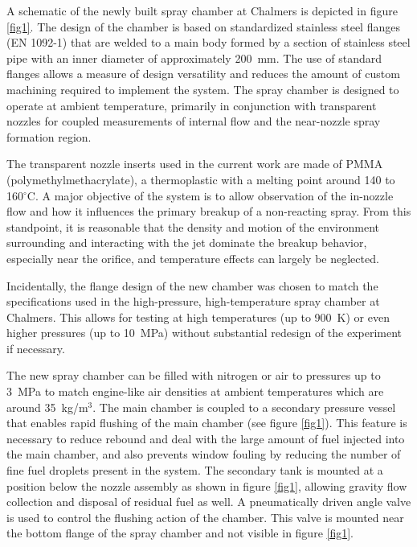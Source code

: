 \documentclass[letterpaper,twocolumn,10pt]{ilass}
\begin{document}
%
A schematic of the newly built spray chamber at Chalmers is depicted in figure \ref{fig1}.
The design of the chamber is based on standardized stainless
steel flanges (EN 1092-1) that are welded to a main body formed by a section of
stainless steel pipe with an inner diameter of approximately 200~mm.
%
The use of standard flanges allows a measure of design versatility and reduces the amount of custom machining required to implement the system.
%
The spray chamber is designed to operate at ambient temperature, primarily in conjunction
with transparent nozzles for coupled measurements of internal flow and the near-nozzle
spray formation region.
%

The transparent nozzle inserts used in the current work are made of PMMA
(polymethylmethacrylate), a thermoplastic with a melting point around
140 to 160$^{\circ}$C.
%
A major objective of the system is to allow observation of the in-nozzle flow and how it
influences the primary breakup of a non-reacting spray. From this standpoint, it is reasonable
that the density and motion of the environment surrounding and interacting with the jet
dominate the breakup behavior, especially near the orifice, and temperature effects can
largely be neglected.
%

Incidentally, the flange design of the new chamber was chosen to match the specifications
used in the high-pressure, high-temperature spray chamber at Chalmers. This allows for
testing at high temperatures (up to 900~K) or even higher pressures (up to 10~MPa)
without substantial redesign of the experiment if necessary.
%

The new spray chamber can be filled with nitrogen or air to pressures up to 3~MPa to
match engine-like air densities at ambient temperatures which are around 35~kg/m$^3$.
The main chamber is coupled to a secondary pressure vessel that enables rapid flushing
of the main chamber (see figure \ref{fig1}).
This feature is necessary to reduce rebound and deal with the large amount of fuel
injected into the main chamber, and also prevents window fouling by reducing the number of
fine fuel droplets present in the system.
The secondary tank is mounted at a position below the nozzle assembly as shown in figure
\ref{fig1}, allowing gravity flow collection and disposal of residual fuel as well.
%
A pneumatically driven angle valve is used to control the flushing action of the chamber.
This valve is mounted near the bottom flange of the spray chamber and not visible in
figure \ref{fig1}. 
\end{document}
